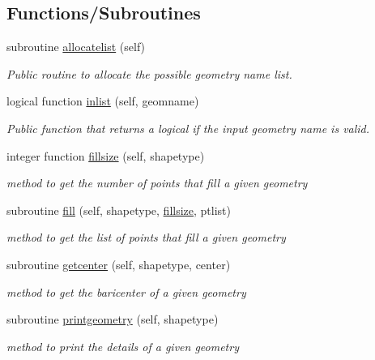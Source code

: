 \subsection*{Functions/\+Subroutines}
\begin{DoxyCompactItemize}
\item 
subroutine \mbox{\hyperlink{namespacegeometry__mod_a1b6f259b0b6be71e02ffae7670f7d8ba}{allocatelist}} (self)
\begin{DoxyCompactList}\small\item\em Public routine to allocate the possible geometry name list. \end{DoxyCompactList}\item 
logical function \mbox{\hyperlink{namespacegeometry__mod_a22dd77024fce56da299445a697256155}{inlist}} (self, geomname)
\begin{DoxyCompactList}\small\item\em Public function that returns a logical if the input geometry name is valid. \end{DoxyCompactList}\item 
integer function \mbox{\hyperlink{namespacegeometry__mod_a92602e1198d3607613ea2722fb002685}{fillsize}} (self, shapetype)
\begin{DoxyCompactList}\small\item\em method to get the number of points that fill a given geometry \end{DoxyCompactList}\item 
subroutine \mbox{\hyperlink{namespacegeometry__mod_a095a8b47b3c23e154dcd31ab1441a065}{fill}} (self, shapetype, \mbox{\hyperlink{namespacegeometry__mod_a92602e1198d3607613ea2722fb002685}{fillsize}}, ptlist)
\begin{DoxyCompactList}\small\item\em method to get the list of points that fill a given geometry \end{DoxyCompactList}\item 
subroutine \mbox{\hyperlink{namespacegeometry__mod_ab591f293deeeb5426b9f14865cc2df67}{getcenter}} (self, shapetype, center)
\begin{DoxyCompactList}\small\item\em method to get the baricenter of a given geometry \end{DoxyCompactList}\item 
subroutine \mbox{\hyperlink{namespacegeometry__mod_aed4426181ca851b41717edd50268e5f3}{printgeometry}} (self, shapetype)
\begin{DoxyCompactList}\small\item\em method to print the details of a given geometry \end{DoxyCompactList}\item 

\end{DoxyCompactItemize}
